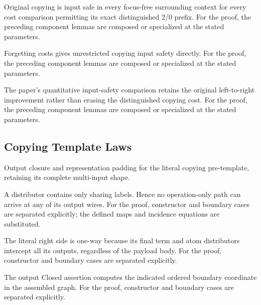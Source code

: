 Original copying is input safe in every focus-free surrounding context for every cost comparison permitting its exact distinguished 2/0 prefix.
For the proof, the preceding component lemmas are composed or specialized at the stated parameters.
\par{}

Forgetting costs gives unrestricted copying input safety directly.
For the proof, the preceding component lemmas are composed or specialized at the stated parameters.
\par{}

The paper's quantitative input-safety comparison retains the original left-to-right improvement rather than erasing the distinguished copying cost.
For the proof, the preceding component lemmas are composed or specialized at the stated parameters.
\par{}

\subsection{Copying Template Laws}
Output closure and representation padding for the literal copying pre-template, retaining its complete multi-input shape.

A distributor contains only sharing labels. Hence no operation-only path can arrive at any of its output wires.
For the proof, constructor and boundary cases are separated explicitly; the defined maps and incidence equations are substituted.
\par{}

The literal right side is one-way because its final term and atom distributors intercept all its outputs, regardless of the payload body.
For the proof, constructor and boundary cases are separated explicitly.
\par{}

The output Closed assertion computes the indicated ordered boundary coordinate in the assembled graph.
For the proof, constructor and boundary cases are separated explicitly.
\par{}


